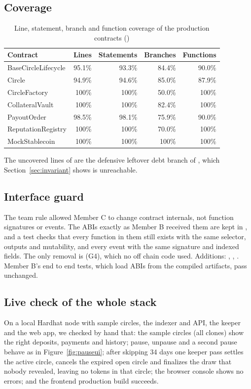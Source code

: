 \subsection{Coverage}
\begin{table}[H]
\centering\small
\caption{Line, statement, branch and function coverage of the production contracts ()}
\label{tab:coverage}
\begin{tabular}{@{}lrrrr@{}}
\toprule
Contract & Lines & Statements & Branches & Functions \\
\midrule
BaseCircleLifecycle & 95.1\% & 93.3\% & 84.4\% & 90.0\% \\
Circle & 94.9\% & 94.6\% & 85.0\% & 87.9\% \\
CircleFactory & 100\% & 100\% & 50.0\% & 100\% \\
CollateralVault & 100\% & 100\% & 82.4\% & 100\% \\
PayoutOrder & 98.5\% & 98.1\% & 75.9\% & 90.0\% \\
ReputationRegistry & 100\% & 100\% & 70.0\% & 100\% \\
MockStablecoin & 100\% & 100\% & 100\% & 100\% \\
\bottomrule
\end{tabular}
\end{table}
The uncovered lines of  are the defensive leftover debt branch of , which
Section~\ref{sec:invariant} shows is unreachable.

\subsection{Interface guard}
\label{sec:abi}
The team rule allowed Member C to change contract internals, not function signatures or events. The ABIs
exactly as Member B received them are kept in , and a test checks
that every function in them still exists with the same selector, outputs and mutability, and every
event with the same signature and indexed fields. The only removal is  (G4), which no
off chain code used. Additions: , ,
. Member B's end to end tests, which load ABIs from the compiled
artifacts, pass unchanged.

\subsection{Live check of the whole stack}
On a local Hardhat node with sample circles, the indexer and API, the keeper and the web app, we
checked by hand that: the sample circles (all clones) show the right deposits, payments and history;
pause, unpause and a second pause behave as in Figure~\ref{fig:pauseui}; after skipping 34 days one keeper
pass settles the active circle, cancels the expired open circle and finalizes the draw that nobody
revealed, leaving no tokens in that circle; the browser console shows no errors; and the frontend
production build succeeds.

